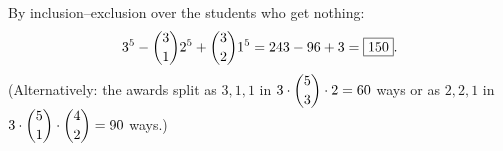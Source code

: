 By inclusion--exclusion over the students who get nothing:
\[3^5-\dbinom31 2^5+\dbinom32 1^5=243-96+3=\boxed{150}.\]
(Alternatively: the awards split as $3,1,1$ in $3\cdot\dbinom53\cdot2=60$ ways or as $2,2,1$ in $3\cdot\dbinom51\cdot\dbinom42=90$ ways.)
